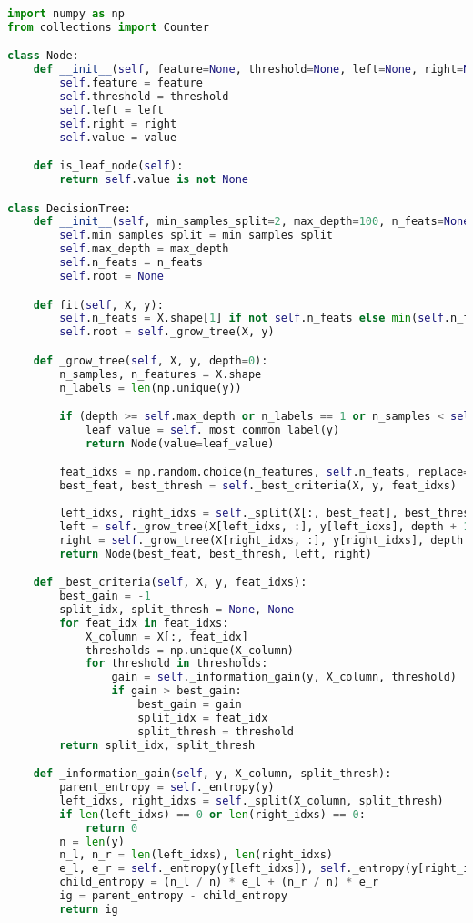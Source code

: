 \documentclass[11pt,a4paper]{article}
\begin{document}
\begin{lstlisting}[language=Python]
import numpy as np
from collections import Counter

class Node:
    def __init__(self, feature=None, threshold=None, left=None, right=None, *, value=None):
        self.feature = feature
        self.threshold = threshold
        self.left = left
        self.right = right
        self.value = value

    def is_leaf_node(self):
        return self.value is not None

class DecisionTree:
    def __init__(self, min_samples_split=2, max_depth=100, n_feats=None):
        self.min_samples_split = min_samples_split
        self.max_depth = max_depth
        self.n_feats = n_feats
        self.root = None

    def fit(self, X, y):
        self.n_feats = X.shape[1] if not self.n_feats else min(self.n_feats, X.shape[1])
        self.root = self._grow_tree(X, y)

    def _grow_tree(self, X, y, depth=0):
        n_samples, n_features = X.shape
        n_labels = len(np.unique(y))

        if (depth >= self.max_depth or n_labels == 1 or n_samples < self.min_samples_split):
            leaf_value = self._most_common_label(y)
            return Node(value=leaf_value)

        feat_idxs = np.random.choice(n_features, self.n_feats, replace=False)
        best_feat, best_thresh = self._best_criteria(X, y, feat_idxs)
        
        left_idxs, right_idxs = self._split(X[:, best_feat], best_thresh)
        left = self._grow_tree(X[left_idxs, :], y[left_idxs], depth + 1)
        right = self._grow_tree(X[right_idxs, :], y[right_idxs], depth + 1)
        return Node(best_feat, best_thresh, left, right)

    def _best_criteria(self, X, y, feat_idxs):
        best_gain = -1
        split_idx, split_thresh = None, None
        for feat_idx in feat_idxs:
            X_column = X[:, feat_idx]
            thresholds = np.unique(X_column)
            for threshold in thresholds:
                gain = self._information_gain(y, X_column, threshold)
                if gain > best_gain:
                    best_gain = gain
                    split_idx = feat_idx
                    split_thresh = threshold
        return split_idx, split_thresh

    def _information_gain(self, y, X_column, split_thresh):
        parent_entropy = self._entropy(y)
        left_idxs, right_idxs = self._split(X_column, split_thresh)
        if len(left_idxs) == 0 or len(right_idxs) == 0:
            return 0
        n = len(y)
        n_l, n_r = len(left_idxs), len(right_idxs)
        e_l, e_r = self._entropy(y[left_idxs]), self._entropy(y[right_idxs])
        child_entropy = (n_l / n) * e_l + (n_r / n) * e_r
        ig = parent_entropy - child_entropy
        return ig


\end{lstlisting}
\end{document}
